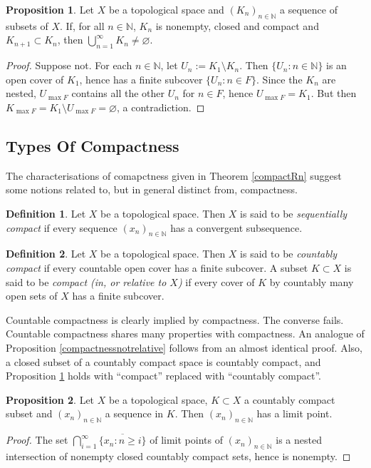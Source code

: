 \documentclass{book}
\theoremstyle{definition}
\newtheorem{proposition}{Proposition}[section]
\newtheorem{definition}{Definition}[section]
\theoremstyle{remark}
\newcommand{\N}{\mathbb{N}}
\begin{document}
\begin{proposition}
\label{nestedintersectioncompact}
Let $X$ be a topological space and $(K_n)_{n\in\N}$ a sequence of subsets of $X$. If, for all $n\in\N$, $K_n$ is nonempty, closed and compact and $K_{n+1}\subset K_n$, then $\bigcup_{n=1}^\infty K_n\neq\varnothing$.
\end{proposition}
\begin{proof}
Suppose not. For each $n\in\N$, let $U_n:=K_1\setminus K_n$. Then $\{U_n:n\in\N\}$ is an open cover of $K_1$, hence has a finite subcover $\{U_n:n\in F\}$. Since the $K_n$ are nested, $U_{\max F}$ contains all the other $U_n$ for $n\in F$, hence $U_{\max F}=K_1$. But then $K_{\max F}=K_1\setminus U_{\max F}=\varnothing$, a contradiction.
\end{proof}

\subsection{Types Of Compactness}
The characterisations of comapctness given in Theorem \ref{compactRn} suggest some notions related to, but in general distinct from, compactness.

\begin{definition}
Let $X$ be a topological space. Then $X$ is said to be \textit{sequentially compact} if every sequence $(x_n)_{n\in\N}$ has a convergent subsequence.
\end{definition}

\begin{definition}
Let $X$ be a topological space. Then $X$ is said to be \textit{countably compact} if every countable open cover has a finite subcover. A subset $K\subset X$ is said to be \textit{compact (in, or relative to $X$)} if every cover of $K$ by countably many open sets of $X$ has a finite subcover.
\end{definition}

Countable compactness is clearly implied by compactness. The converse fails. Countable compactness shares many properties with compactness. An analogue of Proposition \ref{compactnessnotrelative} follows from an almost identical proof. Also, a closed subset of a countably compact space is countably compact, and Proposition \ref{nestedintersectioncompact} holds with ``compact'' replaced with ``countably compact''.

\begin{proposition}
Let $X$ be a topological space, $K\subset X$ a countably compact subset and $(x_n)_{n\in\N}$ a sequence in $K$. Then $(x_n)_{n\in\N}$ has a limit point.
\end{proposition}
\begin{proof}
The set $\bigcap_{i=1}^\infty\overline{\{x_n:n\geq i\}}$ of limit points of $(x_n)_{n\in\N}$ is a nested intersection of nonempty closed countably compact sets, hence is nonempty.
\end{proof}
\end{document}
